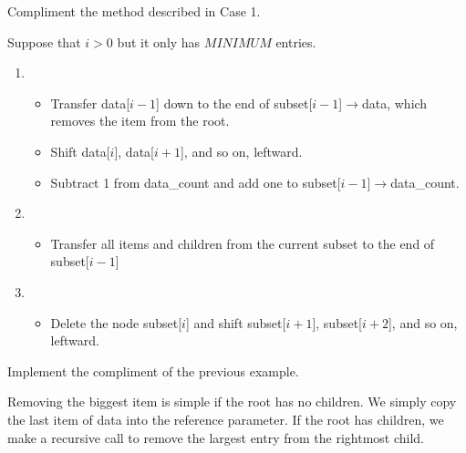 \begin{example} Compliment the method described in Case 1.
\end{example}
\begin{example}
Suppose that $i > 0$ but it only has $MINIMUM$ entries.
\begin{enumerate}
\item
    \begin{itemize}
    \item Transfer data[$i-1$] down to the end of subset[$i-1$]$\to$data, which removes the item from the root.
    \item Shift data[$i$], data[$i+1$], and so on, leftward.
    \item Subtract 1 from data\_count and add one to subset[$i-1$]$\to$data\_count.
    \end{itemize}
\item
    \begin{itemize}
    \item Transfer all items and children from the current subset to the end of subset[$i-1$]
    \end{itemize}
\item
    \begin{itemize}
    \item Delete the node subset[$i$] and shift subset[$i+1$], subset[$i+2$], and so on, leftward.
    \end{itemize}
\end{enumerate}
\end{example}
\begin{example}
\begin{itemize}
Implement the compliment of the previous example.
\end{itemize}
\end{example}
Removing the biggest item is simple if the root has no children. We simply copy the last item of data into the reference parameter. If the root has children, we make a recursive call to remove the largest entry from the rightmost child.


